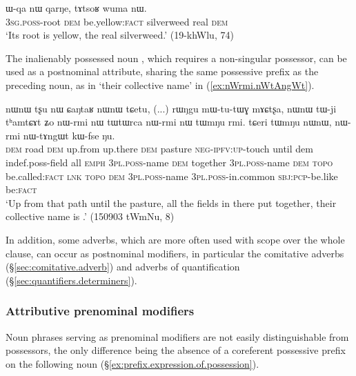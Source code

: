 \begin{exe}
\ex \label{ex:tAtsoR.wuma}
\gll ɯ-qa nɯ qarŋe, tɤtsoʁ wuma nɯ. \\
\textsc{3sg}.\textsc{poss}-root \textsc{dem} be.yellow:\textsc{fact} silverweed real \textsc{dem} \\
\glt `Its root is yellow, the real silverweed.' (19-khWlu, 74)
\end{exe}

The inalienably possessed noun , which requires a non-singular possessor, can be used as a postnominal attribute, sharing the same possessive prefix as the preceding noun, as in  `their collective name' in (\ref{ex:nWrmi.nWtAngWt}).

\begin{exe}
\ex \label{ex:nWrmi.nWtAngWt}
\gll nɯnɯ tʂu nɯ ɕaŋtaʁ nɯnɯ tɕetu, (...) rɯŋgu mɯ-tu-tɯɣ mɤɕtʂa, nɯnɯ tɯ-ji tʰamtɕɤt ʑo nɯ-rmi nɯ tɯtɯrca nɯ-rmi nɯ tɯmŋu rmi.  tɕeri tɯmŋu nɯnɯ, nɯ-rmi nɯ-tɤngɯt kɯ-fse ŋu. \\
\textsc{dem} road \textsc{dem} up.from up.there \textsc{dem} {  } pasture \textsc{neg}-\textsc{ipfv}:\textsc{up}-touch until dem indef.poss-field all \textsc{emph} \textsc{3pl}.\textsc{poss}-name \textsc{dem} together \textsc{3pl}.\textsc{poss}-name \textsc{dem}  \textsc{topo} be.called:\textsc{fact} \textsc{lnk}  \textsc{topo} \textsc{dem}  \textsc{3pl}.\textsc{poss}-name  \textsc{3pl}.\textsc{poss}-in.common \textsc{sbj}:\textsc{pcp}-be.like be:\textsc{fact} \\
\glt `Up from that path until the pasture, all the fields in there put together, their collective name is .' (150903 tWmNu, 8)
\end{exe}

In addition, some adverbs, which are more often used with scope over the whole clause, can occur as postnominal modifiers, in particular the comitative adverbs (§\ref{sec:comitative.adverb}) and adverbs of quantification (§\ref{sec:quantifiers.determiners}).

 
\subsubsection{Attributive prenominal modifiers}   \label{ex:attributive.prenominal}
Noun phrases serving as prenominal modifiers are not easily distinguishable from possessors, the only difference being the absence of a coreferent possessive prefix on the following noun (§\ref{ex:prefix.expression.of.possession}). 

